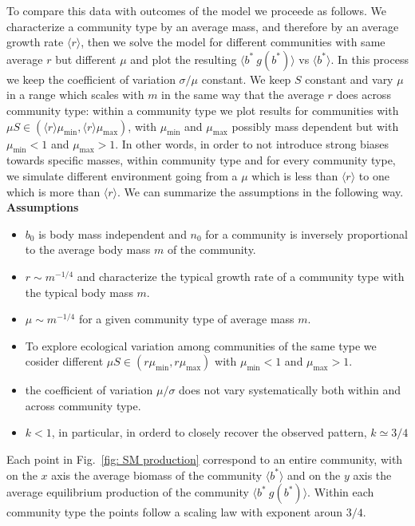 \documentclass[10pt]{article}
\begin{document}
To compare this data with outcomes of the model
we proceede as follows. We characterize a community type
by an average mass, and therefore by an average growth rate $\langle r\rangle$,
then we solve the model for different communities with same average $r$ but
different $\mu$ and plot the resulting $\langle b^* \ g(b^*)\rangle$ vs 
$\langle b^*\rangle$. In this process we keep the coefficient 
of variation $\sigma/\mu$ constant.
We keep $S$ constant and vary $\mu$ in a range which scales
with $m$ in the same way that the average $r$ does across community type:
within a community type we plot results for communities with 
$\mu S\in(\langle r\rangle\mu_{\min}, \langle r\rangle\mu_{\max})$, with $\mu_{\min}$
and $\mu_{\max}$ possibly mass dependent but with $\mu_{\min}<1$ and $\mu_{\max}>1$.
In other words, in order to not introduce strong  biases towards specific
masses, within community type and for every community type,
we simulate different environment 
going from a $\mu$ which is 
less than $\langle r\rangle$ to one which is more than $\langle r\rangle$.
We can summarize the assumptions in the following way.
\\

\textbf{Assumptions}
\begin{itemize}
    \item $b_0$ is body mass independent
          and $n_0$ for a community is inversely proportional to the average
          body mass $m$ of the community.
    \item $ r \sim m^{-1/4}$ and characterize the typical growth rate
          of a community type with the typical body mass $m$.
    \item $\mu\sim m^{-1/4}$ for a given community type of average mass $m$.
    \item To explore ecological variation among communities
          of the same type we cosider different 
          $\mu S\in(r\mu_{\min}, r\mu_{\max})$
          with $\mu_{\min}<1$ and $\mu_{\max}>1$.
    \item the coefficient of variation $\mu/\sigma$ does not vary systematically
          both within and across community type.
    \item $k<1$, in particular, in orderd to closely recover the observed pattern, $k\simeq3/4$
\end{itemize}
Each point in Fig.~\ref{fig: SM production} 
correspond
to an entire community, with on the $x$ axis the average biomass
of the community $\langle b^* \rangle$ and on the $y$ axis the
average equilibrium production of the community 
$\langle b^* \ g(b^*)\rangle$. Within each community type the points follow
a scaling law with exponent aroun $3/4$.
\end{document}
